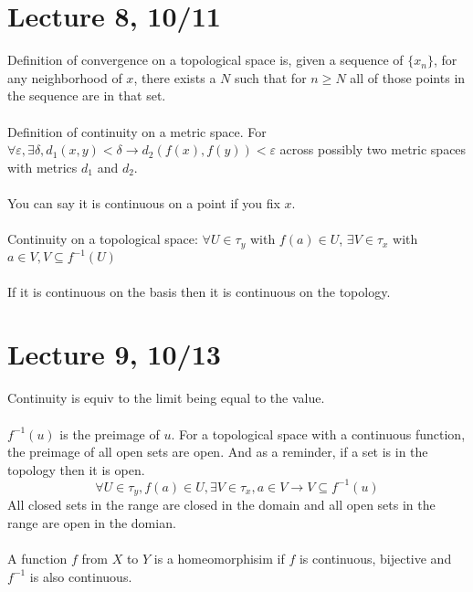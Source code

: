 \documentclass[12pt]{article}
\begin{document}
\section{Lecture 8, 10/11}
Definition of convergence on a topological space is, given a sequence of $\{x_n\}$, for any neighborhood of $x$, there exists a $N$ such that for $n \geq N$ all of those points in the sequence are in that set. \\\\
Definition of continuity on a metric space. For $\forall \varepsilon, \exists \delta, d_1(x,y) < \delta \longrightarrow d_2(f(x),f(y)) < \varepsilon$ across possibly two metric spaces with metrics $d_1$ and $d_2$.\\\\
You can say it is continuous on a point if you fix $x$. \\\\
Continuity on a topological space: $\forall U \in \tau_y$ with $f(a) \in U$, $\exists V \in \tau_x$ with $a \in V, V \subseteq f^{-1}(U)$\\\\
If it is continuous on the basis then it is continuous on the topology. 

\newpage
\section{Lecture 9, 10/13}
Continuity is equiv to the limit being equal to the value. \\\\
$f^{-1}(u)$ is the preimage of $u$. For a topological space with a continuous function, the preimage of all open sets are open. And as a reminder, if a set is in the topology then it is open. 
$$\forall U \in \tau_y, f(a) \in U, \exists V \in \tau_x, a \in V \longrightarrow V \subseteq f^{-1}(u)$$
All closed sets in the range are closed in the domain and all open sets in the range are open in the domian. \\\\
A function $f$ from $X$ to $Y$ is a homeomorphisim if $f$ is continuous, bijective and $f^{-1}$ is also continuous.
\end{document}
